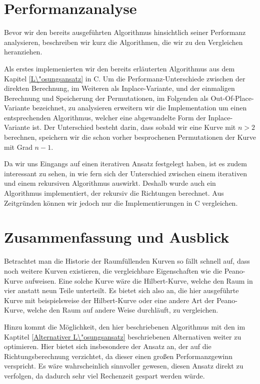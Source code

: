 \documentclass[course=asp]{aspdoc}
\begin{document}
\newpage
\section{Performanzanalyse} \label{Performanzanalyse}
Bevor wir den bereits ausgef\"uhrten Algorithmus hinsichtlich seiner Performanz analysieren, beschreiben wir kurz die Algorithmen, die wir zu den Vergleichen heranziehen.

Als erstes implemenierten wir den bereits erl\"auterten Algorithmus aus dem Kapitel \ref{L\"osungsansatz} in C. Um die Performanz-Unterschiede zwischen der direkten Berechnung, im Weiteren als Inplace-Variante, und der einmaligen Berechnung und Speicherung der Permutationen, im Folgenden als Out-Of-Place-Variante bezeichnet, zu analysieren erweitern wir die Implementation um einen entsprechenden Algorithmus, welcher eine abgewandelte Form der Inplace-Variante ist. Der Unterschied besteht darin, dass sobald wir eine Kurve mit $n > 2$ berechnen, speichern wir die schon vorher besprochenen Permutationen der Kurve mit Grad $n - 1$. 

Da wir uns Eingangs auf einen iterativen Ansatz festgelegt haben, ist es zudem interessant zu sehen, in wie fern sich der Unterschied zwischen einem iterativen und einem rekursiven Algorithmus auswirkt. Deshalb wurde auch ein Algorithmus implementiert, der rekursiv die Richtungen berechnet. Aus Zeitgr\"unden k\"onnen wir jedoch nur die Implementierungen in C vergleichen. 



\newpage
\section{Zusammenfassung und Ausblick} \label{Zusammenfassung und Ausblick}


Betrachtet man die Historie der Raumf\"ullenden Kurven so f\"allt schnell auf, dass noch weitere Kurven existieren, die vergleichbare Eigenschaften wie die Peano-Kurve aufweisen. Eine solche Kurve w\"are die Hilbert-Kurve, welche den Raum in vier anstatt neun Teile unterteilt. Es bietet sich also an, die hier ausgef\"uhrte Kurve mit beispielsweise der Hilbert-Kurve oder eine andere Art der Peano-Kurve, welche den Raum auf andere Weise durchl\"auft, zu vergleichen. %


Hinzu kommt die M\"oglichkeit, den hier beschriebenen Algorithmus mit den im Kaptitel \ref{Alternativer L\"osungsansatz} beschriebenen Alternativen weiter zu optimieren. Hier bietet sich insbesondere der Ansatz an, der auf die Richtungsberechnung verzichtet, da dieser einen gro\ss en Performanzgewinn verspricht.
Es w\"are wahrscheinlich sinnvoller gewesen, diesen Ansatz direkt zu verfolgen, da dadurch sehr viel Rechenzeit gespart werden w\"urde.
\end{document}
